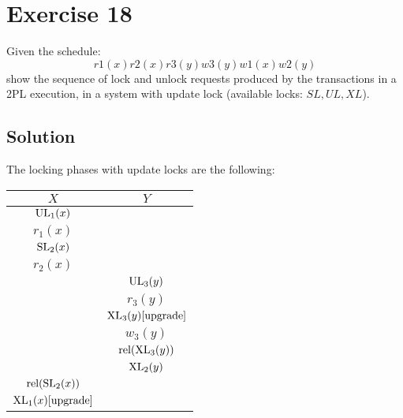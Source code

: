 \section{Exercise 18}

Given the schedule:
\[r1(x) r2(x) r3(y) w3(y) w1(x) w2(y)\]
show the sequence of lock and unlock requests produced by the transactions in a 2PL execution, in a system with update lock (available locks: $SL, UL, XL$).

\subsection*{Solution}
The locking phases with update locks are the following: 
\begin{table}[H]
    \centering
    \begin{tabular}{|c|c|}
    \hline
    $X$                                           & $Y$                                           \\ \hline
    $\textnormal{UL}_1(x)$                        &                                               \\
    $r_1(x)$                                      &                                               \\
    $\textnormal{SL}_2(x)$                        &                                               \\
    $r_2(x)$                                      &                                               \\
                                                    & $\textnormal{UL}_3(y)$                        \\
                                                    & $r_3(y)$                                      \\
                                                    & $\textnormal{XL}_3(y) [\textnormal{upgrade}]$ \\
                                                    & $w_3(y)$                                      \\
                                                    & $\textnormal{rel}(\textnormal{XL}_3(y))$      \\
                                                    & $\textnormal{XL}_2(y)$                        \\
    $\textnormal{rel}(\textnormal{SL}_2(x))$      &                                               \\
    $\textnormal{XL}_1(x) [\textnormal{upgrade}]$ &                                               \\

\end{tabular}
\end{table}
